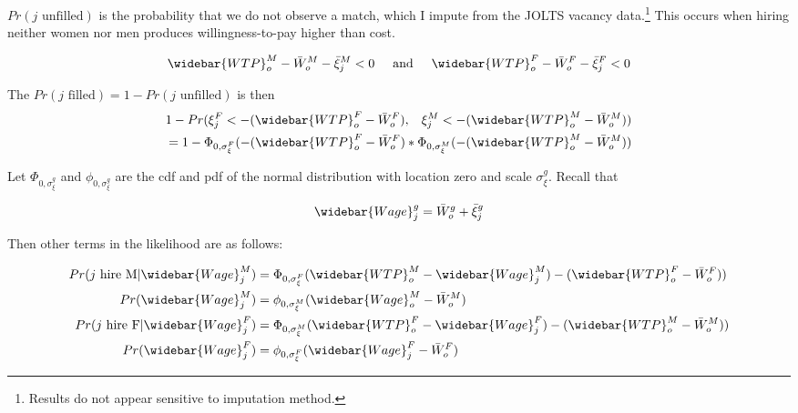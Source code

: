 \documentclass[12pt]{article}
\begin{document}





$Pr(\text{$j$ unfilled}) $ is the probability that we do not observe a match, which I impute from the JOLTS vacancy data.\footnote{Results do not appear sensitive to imputation method.} This occurs when hiring neither women nor men produces willingness-to-pay higher than cost.

\begin{align*}
 \widebar{WTP}^M_o - \bar{W}^M_o - \bar{\xi}^M_j < 0 \hspace{5mm} \text{and} \hspace{5mm} \widebar{WTP}^F_o - \bar{W}^F_o -  \bar{\xi}^F_j < 0 \\
\end{align*}

The $Pr( \text{$j$ filled}) = 1 - Pr( \text{$j$ unfilled}) $ is then
\begin{align*}
1- Pr(\xi^F_j< -(\widebar{WTP}^F_o - \bar{W}^F_o), \hspace{3mm} \xi^M_j< -(\widebar{WTP}^M_o - \bar{W}^M_o )) & \\
= 1 - \Phi_{0,\sigma^F_{\xi}}(-(\widebar{WTP}^F_o - \bar{W}^F_o)* \Phi_{0,\sigma^M_{\xi}}(-(\widebar{WTP}^M_o - \bar{W}^M_o))
\end{align*}

Let $\Phi_{0,\sigma^g_{\xi}}$ and $\phi_{0,\sigma^g_{\xi}}$ are the cdf and pdf of the normal distribution with location zero and scale $\sigma^g_{\xi}$. Recall that

$$ \widebar{Wage}^g_j = \bar{W}^g_o + \bar{\xi}^g_j $$

Then other terms in the likelihood are as follows:

\begin{align*}
Pr(\text{$j$ hire M} | \widebar{Wage}^M_{j} ) &= \Phi_{0,\sigma^F_{\xi}}( \widebar{WTP}^M_o -  \widebar{Wage}^M_j) - (\widebar{WTP}^F_o - \bar{W}^F_o))  \\
Pr(\widebar{Wage}^M_{j} ) &= \phi_{0,\sigma^M_{\xi}}( \widebar{Wage}^M_o - \bar{W}^M_o)  \\
Pr(\text{$j$ hire F} | \widebar{Wage}^F_{j}) &= \Phi_{0,\sigma^M_{\xi}}( \widebar{WTP}^F_o -  \widebar{Wage}^F_j) - (\widebar{WTP}^M_o - \bar{W}^M_o))  \\
Pr(\widebar{Wage}^F_{j}) &=  \phi_{0,\sigma^F_{\xi}}( \widebar{Wage}^F_j - \bar{W}^F_o)  \\
\end{align*}
\end{document}
